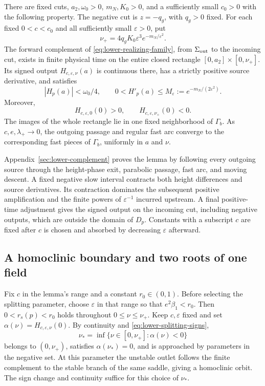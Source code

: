\begin{lemma}\label{lem:realizing-complement}
There are fixed cuts, $a_2,\omega_0>0$, $m_N,K_0>0$, and a
sufficiently small $c_0>0$ with the following property.
The negative cut is $z=-q_g$, with $q_g>0$ fixed.
For each fixed $0<c<c_0$ and all sufficiently small
$\varepsilon>0$, put
\begin{equation}\label{eq:lower-forcing-window}
 \nu_+=4q_gK_0\varepsilon^3e^{-m_N/\varepsilon^2}.
\end{equation}
The forward complement of \eqref{eq:lower-realizing-family}, from
$\Sigma_{\rm out}$ to the incoming cut, exists in finite physical
time on the entire closed rectangle
$[0,a_2]\times[0,\nu_+]$. Its signed output $H_{c,\varepsilon,\nu}(a)$
is continuous there, has a strictly positive source derivative, and
satisfies
\begin{equation}\label{eq:lower-complement-contract}
 |H_p(a)|<\omega_0/4,\qquad
 0<H'_p(a)\le M_\varepsilon:=e^{-m_N/(2\varepsilon^2)} .
\end{equation}
Moreover,
\begin{equation}\label{eq:lower-splitting-signs}
 H_{c,\varepsilon,0}(0)>0,\qquad
 H_{c,\varepsilon,\nu_+}(0)<0 .
\end{equation}
The images of the whole rectangle lie in one fixed neighborhood of
$\Gamma_b$. As $c,e,\lambda_+\to0$, the outgoing
passage and regular fast arc converge to the corresponding fast
pieces of $\Gamma_b$, uniformly in $a$ and $\nu$.
\end{lemma}

Appendix~\ref{sec:lower-complement} proves the lemma by following every
outgoing source through the height-phase exit, parabolic passage,
fast arc, and moving descent. A fixed negative slow interval contracts
both height differences and source derivatives. Its contraction
dominates the subsequent positive amplification and the finite powers
of $\varepsilon^{-1}$ incurred upstream. A final positive-time
adjustment gives the signed output on the incoming cut, including
negative outputs, which are outside the domain of $D_p$. Constants
with a subscript $c$ are fixed after $c$ is chosen and absorbed by
decreasing $\varepsilon$ afterward.

\subsection{A homoclinic boundary and two roots of one field}
Fix $c$ in the lemma's range and a constant $r_0\in(0,1)$.
Before selecting the splitting parameter, choose $\varepsilon$
in that range so that $e^2\beta_1<r_0$. Then $0<r_s(p)<r_0$
holds throughout $0\le\nu\le\nu_+$. Keep $c,\varepsilon$ fixed
and set $\alpha(\nu)=H_{c,\varepsilon,\nu}(0)$. By continuity and
\eqref{eq:lower-splitting-signs},
\[
 \nu_*=\inf\{\nu\in[0,\nu_+]:\alpha(\nu)<0\}
\]
belongs to $(0,\nu_+)$, satisfies $\alpha(\nu_*)=0$, and is
approached by parameters in the negative set. At this parameter
the unstable outlet follows the finite complement to the stable
branch of the same saddle, giving a homoclinic orbit. The sign
change and continuity suffice for this choice of $\nu_*$.

